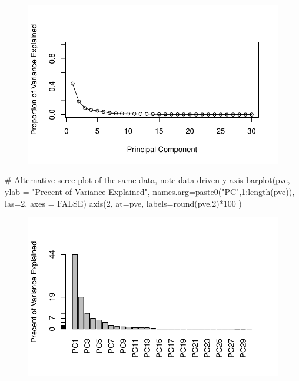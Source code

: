 \documentclass[
  letterpaper,
  DIV=11,
  numbers=noendperiod]{scrartcl}
\newenvironment{Shaded}{\begin{snugshade}}{\end{snugshade}}
\newcommand{\AttributeTok}[1]{\textcolor[rgb]{0.40,0.45,0.13}{#1}}
\newcommand{\CommentTok}[1]{\textcolor[rgb]{0.37,0.37,0.37}{#1}}
\newcommand{\ConstantTok}[1]{\textcolor[rgb]{0.56,0.35,0.01}{#1}}
\newcommand{\DecValTok}[1]{\textcolor[rgb]{0.68,0.00,0.00}{#1}}
\newcommand{\FunctionTok}[1]{\textcolor[rgb]{0.28,0.35,0.67}{#1}}
\newcommand{\NormalTok}[1]{\textcolor[rgb]{0.00,0.23,0.31}{#1}}
\newcommand{\SpecialCharTok}[1]{\textcolor[rgb]{0.37,0.37,0.37}{#1}}
\newcommand{\StringTok}[1]{\textcolor[rgb]{0.13,0.47,0.30}{#1}}
\begin{document}
\begin{figure}[H]

{\centering \includegraphics{test_files/figure-pdf/unnamed-chunk-12-1.pdf}

}

\end{figure}

\begin{Shaded}
\begin{Highlighting}[]
\CommentTok{\# Alternative scree plot of the same data, note data driven y{-}axis}
\FunctionTok{barplot}\NormalTok{(pve, }\AttributeTok{ylab =} \StringTok{"Precent of Variance Explained"}\NormalTok{,}
     \AttributeTok{names.arg=}\FunctionTok{paste0}\NormalTok{(}\StringTok{"PC"}\NormalTok{,}\DecValTok{1}\SpecialCharTok{:}\FunctionTok{length}\NormalTok{(pve)), }\AttributeTok{las=}\DecValTok{2}\NormalTok{, }\AttributeTok{axes =} \ConstantTok{FALSE}\NormalTok{)}
\FunctionTok{axis}\NormalTok{(}\DecValTok{2}\NormalTok{, }\AttributeTok{at=}\NormalTok{pve, }\AttributeTok{labels=}\FunctionTok{round}\NormalTok{(pve,}\DecValTok{2}\NormalTok{)}\SpecialCharTok{*}\DecValTok{100}\NormalTok{ )}
\end{Highlighting}
\end{Shaded}

\begin{figure}[H]

{\centering \includegraphics{test_files/figure-pdf/unnamed-chunk-13-1.pdf}

}

\end{figure}
\end{document}
